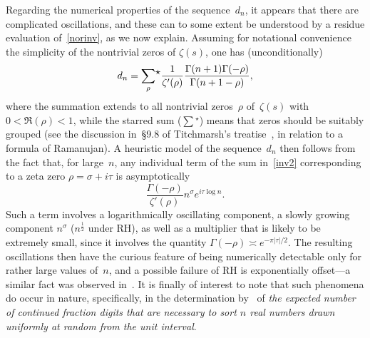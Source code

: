 \documentclass{amsart}
\begin{document}
Regarding the numerical properties of
the sequence~$d_n$, it appears that there are complicated oscillations, and these
 can to some extent be understood by a residue evaluation 
of~\eqref{norinv}, as we now explain. Assuming for notational convenience the simplicity 
of the nontrivial zeros of $\zeta(s)$, one has (unconditionally)
\begin{equation}\label{inv2}
d_n= \sum_{\rho}\!{}^{\hbox{$\star$}} \frac{1}{\zeta'(\rho)} 
\frac{\Gamma(n+1)\Gamma(-\rho)}{\Gamma(n+1-\rho)},
\end{equation}
where   the   summation   extends  to   all   nontrivial  zeros~$\rho$
of~$\zeta(s)$   with   $0<\Re(\rho)<1$,   while   the    starred   sum
($\sum{}\!{}^{\star}$) means  that  zeros should  be  suitably grouped
(see         the    discussion     in~\S9.8     of        Titchmarsh's
treatise~\cite[p.~219]{Titchmarsh86},   in  relation to  a  formula of
Ramanujan). A heuristic model of the sequence~$d_n$ then follows from the fact that,
for large~$n$, any individual term of the sum in~\eqref{inv2} 
corresponding to a zeta zero $\rho=\sigma+i\tau$
is  asymptotically
\[
\frac{\Gamma(-\rho)}{\zeta'(\rho)} n^{\sigma} e^{i\tau\log n}.\]
Such a term involves  a logarithmically oscillating  component,  a
slowly growing  component  $n^\sigma$ ($n^{\frac12}$ under  RH), as well as a
multiplier that  is likely   to  be extremely small, since    it involves
the quantity $\Gamma(-\rho)\asymp e^{-\pi|\tau|/2}$.  The  resulting   oscillations
then have the curious feature of being numerically detectable only for
rather large  values  of~$n$, and a  possible failure  of RH is
exponentially  offset---a       similar    fact   was     observed
in~\cite{FlVa00,Maslanka06}.  It is finally of  interest to note  that
such   phenomena   do  occur   in   nature,   specifically,   in   the
determination by~\cite{FlVa00} of  \emph{the    expected number  of  continued
fraction digits  that are  necessary to  sort $n$  real numbers
drawn uniformly at random from the unit interval}.




\end{document}
